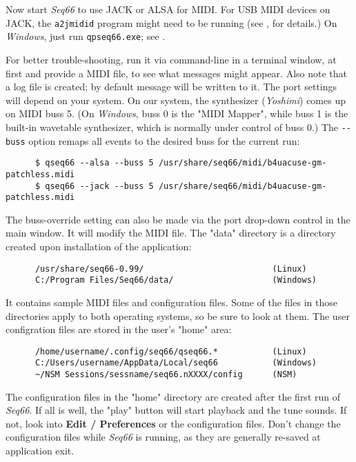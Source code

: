    Now start \textsl{Seq66} to use JACK or ALSA for MIDI.
   For USB MIDI devices on JACK, the \texttt{a2jmidid} program might
   need to be running
   (see , for details.)
   On \textsl{Windows}, just run \texttt{qpseq66.exe};
   see .

   For better trouble-shooting, run it via command-line in
   a terminal window, at first and provide a MIDI file, to
   see what messages might appear.
   Also note that a log file is created; by default message will be
   written to it.
   The port settings will depend on your system.
   On our system, the synthesizer (\textsl{Yoshimi}) comes up on MIDI buss 5.
   (On \textsl{Windows}, buss 0 is the "MIDI Mapper", while buss 1 is the
   built-in wavetable synthesizer, which is normally under control of buss 0.)
   The \texttt{-{}-buss} option remaps all events to the desired buss for
   the current run:

   \begin{verbatim}
      $ qseq66 --alsa --buss 5 /usr/share/seq66/midi/b4uacuse-gm-patchless.midi
      $ qseq66 --jack --buss 5 /usr/share/seq66/midi/b4uacuse-gm-patchless.midi
   \end{verbatim}

   The buss-override setting can also be made via the port drop-down control
   in the main window. It will modify the MIDI file.
   The "data" directory is a directory created upon installation of the
   application:

   \begin{verbatim}
      /usr/share/seq66-0.99/                          (Linux)
      C:/Program Files/Seq66/data/                    (Windows)
   \end{verbatim}

   It contains sample MIDI files and configuration files.
   Some of the files in those directories apply to both operating systems, so
   be sure to look at them.
   The user configration files are stored in the user's "home" area:

   \begin{verbatim}
      /home/username/.config/seq66/qseq66.*           (Linux)
      C:/Users/username/AppData/Local/seq66           (Windows)
      ~/NSM Sessions/sessname/seq66.nXXXX/config      (NSM)
   \end{verbatim}

   The configuration files in the "home" directory
   are created after the first run of \textsl{Seq66}.
   If all is well, the "play" button will start playback and the tune sounds.
   If not, look into \textbf{Edit / Preferences} or the configuration files.
   Don't change the configuration files while \textsl{Seq66} is running, as
   they are generally re-saved at application exit.

